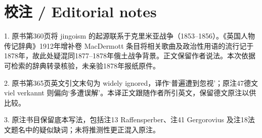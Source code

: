 \documentclass[10pt,a4paper]{article}
\begin{document}
\section*{校注 / Editorial notes}
1. 原书第360页将 jingoism 的起源联系于克里米亚战争（1853–1856）。《英国人物传记辞典》1912年增补卷 MacDermott 条目将相关歌曲及政治性用语的流行记于1878年，故此处疑混同1877–1878年俄土战争背景。正文保留作者说法。本次依据可检索的辞典转录核验，未亲验1878年报纸原件。\par
2. 原书第365页英文引文末句为 widely ignored，译作‘普遍遭到忽视’；原注47德文 viel verkannt 则偏向‘多遭误解’。本译正文跟随作者所引英文，保留德文原注以供比较。\par
3. 原注书目保留底本写法，包括注13 Raffensperber、注41 Gergorovius 及注18法文题名中的疑似缺词；未将推测性更正混入原注。\par
\end{document}
